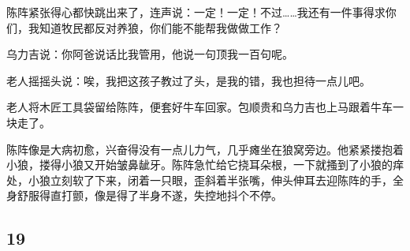 \par 陈阵紧张得心都快跳出来了，连声说：一定！一定！不过……我还有一件事得求你们，我知道牧民都反对养狼，你们能不能帮我做做工作？
\par 乌力吉说：你阿爸说话比我管用，他说一句顶我一百句呢。
\par 老人摇摇头说：唉，我把这孩子教过了头，是我的错，我也担待一点儿吧。
\par 老人将木匠工具袋留给陈阵，便套好牛车回家。包顺贵和乌力吉也上马跟着牛车一块走了。
\par 陈阵像是大病初愈，兴奋得没有一点儿力气，几乎瘫坐在狼窝旁边。他紧紧搂抱着小狼，搂得小狼又开始皱鼻龇牙。陈阵急忙给它挠耳朵根，一下就搔到了小狼的痒处，小狼立刻软了下来，闭着一只眼，歪斜着半张嘴，伸头伸耳去迎陈阵的手，全身舒服得直打颤，像是得了半身不遂，失控地抖个不停。


\subsection*{19}


